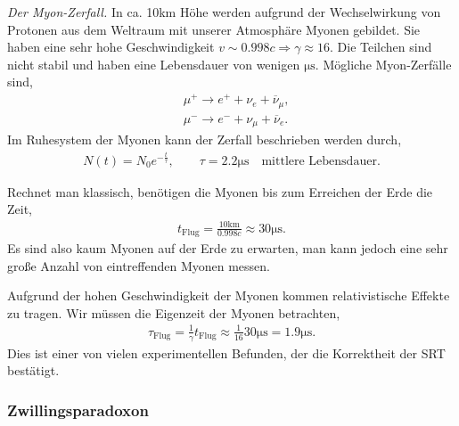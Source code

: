 \begin{bsp}
\textit{Der Myon-Zerfall.}
In ca. 10km Höhe werden aufgrund der Wechselwirkung von Protonen aus dem
Weltraum mit unserer Atmosphäre Myonen gebildet. Sie haben eine sehr hohe
Geschwindigkeit $v\sim 0.998c\Rightarrow\gamma\approx 16$. Die Teilchen sind
nicht stabil und haben eine Lebensdauer von wenigen $\mathrm{\mu s}$. Mögliche
Myon-Zerfälle sind,
\begin{align*}
&\mu^+ \longrightarrow e^+ + \nu_e  + \overline{\nu}_\mu,\\
&\mu^- \longrightarrow e^- + \nu_\mu  + \overline{\nu}_e.
\end{align*}
Im Ruhesystem der Myonen kann der Zerfall beschrieben werden durch,
\begin{align*}
N(t) = N_0 e^{-\frac{t}{\tau}},\qquad \tau = 2.2\mathrm{\mu s}\quad
\text{mittlere Lebensdauer}.
\end{align*}

Rechnet man klassisch, benötigen die Myonen bis zum Erreichen der Erde die Zeit,
\begin{align*}
t_{\text{Flug}} = \frac{10\mathrm{km}}{0.998c} \approx 30 \mathrm{\mu s}.
\end{align*}
Es sind also kaum Myonen auf der Erde zu erwarten, man kann jedoch eine sehr
große Anzahl von eintreffenden Myonen messen.

Aufgrund der hohen Geschwindigkeit der Myonen kommen relativistische Effekte
zu tragen. Wir müssen die Eigenzeit der Myonen betrachten,
\begin{align*}
\tau_{\text{Flug}} = \frac{1}{\gamma}t_{\text{Flug}} \approx
\frac{1}{16}30\mathrm{\mu s} = 1.9\mathrm{\mu s}.
\end{align*}
Dies ist einer von vielen experimentellen Befunden, der die Korrektheit der SRT
bestätigt.\bsphere
\end{bsp}

\subsubsection{Zwillingsparadoxon}

